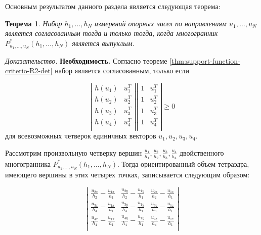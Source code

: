 \documentclass[a4paper, 12pt, titlepage]{article}
\theoremstyle{definition}
\theoremstyle{plain}
\newtheorem{SmartTheorem}{Теорема}
\theoremstyle{plain}
\begin{document}
 Основным результатом данного раздела является следующая теорема:

\begin{SmartTheorem}
 Набор $h_{1}, \ldots, h_{N}$ измерений опорных чисел по направлениям $u_{1},
 \ldots, u_{N}$ является согласованным тогда и только тогда, когда многогранник
 $P^{*}_{u_{1}, \ldots, u_{N}}(h_{1}, \ldots, h_{N})$ является выпуклым.
\end{SmartTheorem}

\begin{flushleft}
 \textit{Доказательство.} \textbf{Необходимость.} Согласно теореме 
 \ref{thm:support-function-criterio-R2-det} набор является согласованным,
 только если

 \begin{equation}
  \left|\begin{array}{cc}
   h(u_{1}) & u_{1}^{T} \\
   h(u_{2}) & u_{2}^{T} \\
   h(u_{3}) & u_{3}^{T} \\
   h(u_{4}) & u_{4}^{T} \\
  \end{array}\right|
   \left|\begin{array}{cc}
   1 & u_{1}^{T} \\
   1 & u_{2}^{T} \\
   1 & u_{3}^{T} \\
   1 & u_{4}^{T} \\
  \end{array}\right|
  \geq 0
 \end{equation}
 для всевозможных четверок единичных векторов $u_{1}, u_{2}, u_{3}, u_{4}$.

 Рассмотрим произвольную четверку вершин $\frac{u_{1}}{h_{1}},
 \frac{u_{2}}{h_{2}},  \frac{u_{3}}{h_{3}}, \frac{u_{4}}{h_{4}}$ двойственного
 многогранника $P^{*}_{u_{1}, \ldots, u_{N}}(h_{1}, \ldots, h_{N})$. Тогда 
 ориентированный объем тетраэдра, имеющего вершины в этих четырех точках, 
 записывается следующим образом:

 \begin{equation}
  \left|\begin{array}{ccc}
   \frac{u_{2x}}{h_{2}} - \frac{u_{1x}}{h_{1}} &
   \frac{u_{2y}}{h_{2}} - \frac{u_{1y}}{h_{1}} &
   \frac{u_{2z}}{h_{2}} - \frac{u_{1z}}{h_{1}} \\
   \frac{u_{3x}}{h_{3}} - \frac{u_{1x}}{h_{1}} &
   \frac{u_{3y}}{h_{3}} - \frac{u_{1y}}{h_{1}} &
   \frac{u_{3z}}{h_{3}} - \frac{u_{1z}}{h_{1}} \\
   \frac{u_{4x}}{h_{4}} - \frac{u_{1x}}{h_{1}} &
   \frac{u_{4y}}{h_{4}} - \frac{u_{1y}}{h_{1}} &
   \frac{u_{4z}}{h_{4}} - \frac{u_{1z}}{h_{1}} \\
  \end{array}\right|
 \end{equation}


\end{flushleft}
\end{document}
